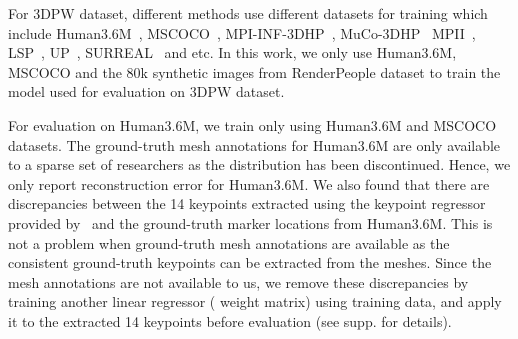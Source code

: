 For 3DPW dataset, different methods use different datasets for training which include Human3.6M~\cite{h36m_pami}, MSCOCO~\cite{lin2014microsoft}, MPI-INF-3DHP~\cite{mono20173dhp}, MuCo-3DHP~\cite{mehta2018multi}
MPII~\cite{andriluka14cvpr}, LSP~\cite{johnson2010lsp}, UP~\cite{lassner2017unite}, SURREAL~\cite{varol17b} and etc. In this work, we only use Human3.6M, MSCOCO and the 80k synthetic images from RenderPeople dataset to train the model used for evaluation on 3DPW dataset. 

For evaluation on Human3.6M, we train only using Human3.6M and MSCOCO datasets. The ground-truth mesh annotations for Human3.6M are only available to a sparse set of researchers as the distribution has been  discontinued. Hence, we only report reconstruction error for Human3.6M. We also found that there are discrepancies between the 14 keypoints extracted using the keypoint regressor provided by~\cite{bogo2016keep} and the ground-truth marker locations from Human3.6M. This is not a problem when ground-truth mesh annotations are available as the consistent ground-truth keypoints can be extracted from the meshes. Since the mesh annotations are not available to us, we remove these discrepancies by training another linear regressor ( weight matrix) using training data, and apply it to the extracted 14 keypoints before evaluation (see supp. for details). 


